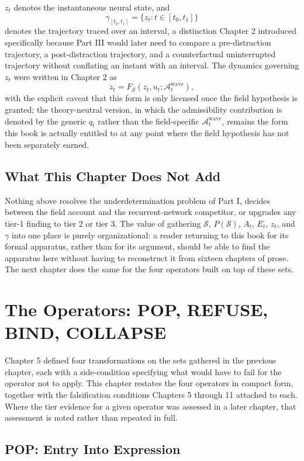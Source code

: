 \documentclass[11pt]{book}
\begin{document}
$z_t$ denotes the instantaneous neural state, and
\[
\gamma_{[t_0,t_1]}=\{z_t:t\in[t_0,t_1]\}
\]
denotes the trajectory traced over an interval, a distinction Chapter 2 introduced specifically because Part III would later need to compare a pre-distraction trajectory, a post-distraction trajectory, and a counterfactual uninterrupted trajectory without conflating an instant with an interval. The dynamics governing $z_t$ were written in Chapter 2 as
\[
\dot z_t=F_{\mathcal S}(z_t,u_t;\mathcal A_t^{\mathrm{wave}}),
\]
with the explicit caveat that this form is only licensed once the field hypothesis is granted; the theory-neutral version, in which the admissibility contribution is denoted by the generic $q_t$ rather than the field-specific $\mathcal A_t^{\mathrm{wave}}$, remains the form this book is actually entitled to at any point where the field hypothesis has not been separately earned.

\section*{What This Chapter Does Not Add}

Nothing above resolves the underdetermination problem of Part I, decides between the field account and the recurrent-network competitor, or upgrades any tier-1 finding to tier 2 or tier 3. The value of gathering $\mathcal S$, $P(\mathcal S)$, $A_t$, $E_t$, $z_t$, and $\gamma$ into one place is purely organizational: a reader returning to this book for its formal apparatus, rather than for its argument, should be able to find the apparatus here without having to reconstruct it from sixteen chapters of prose. The next chapter does the same for the four operators built on top of these sets.

\chapter{The Operators: POP, REFUSE, BIND, COLLAPSE}

Chapter 5 defined four transformations on the sets gathered in the previous chapter, each with a side-condition specifying what would have to fail for the operator not to apply. This chapter restates the four operators in compact form, together with the falsification conditions Chapters 5 through 11 attached to each. Where the tier evidence for a given operator was assessed in a later chapter, that assessment is noted rather than repeated in full.

\section*{POP: Entry Into Expression}
\end{document}
